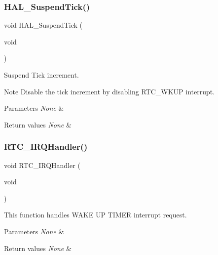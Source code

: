 \subsubsection{\texorpdfstring{H\+A\+L\+\_\+\+Suspend\+Tick()}{HAL\_SuspendTick()}}
{\footnotesize\ttfamily void H\+A\+L\+\_\+\+Suspend\+Tick (\begin{DoxyParamCaption}\item[{void}]{ }\end{DoxyParamCaption})}



Suspend Tick increment. 

\begin{DoxyNote}{Note}
Disable the tick increment by disabling R\+T\+C\+\_\+\+W\+K\+UP interrupt. 
\end{DoxyNote}

\begin{DoxyParams}{Parameters}
{\em None} & \\
\hline
\end{DoxyParams}

\begin{DoxyRetVals}{Return values}
{\em None} & \\
\hline
\end{DoxyRetVals}
\mbox{\label{group___h_a_l___time_base___r_t_c___wake_up___template_gab86b9dd0d7b4eacfe38086e1fa4c2312}} 
\subsubsection{\texorpdfstring{R\+T\+C\+\_\+\+I\+R\+Q\+Handler()}{RTC\_IRQHandler()}}
{\footnotesize\ttfamily void R\+T\+C\+\_\+\+I\+R\+Q\+Handler (\begin{DoxyParamCaption}\item[{void}]{ }\end{DoxyParamCaption})}



This function handles W\+A\+KE UP T\+I\+M\+ER interrupt request. 


\begin{DoxyParams}{Parameters}
{\em None} & \\
\hline
\end{DoxyParams}

\begin{DoxyRetVals}{Return values}
{\em None} & \\
\hline
\end{DoxyRetVals}
